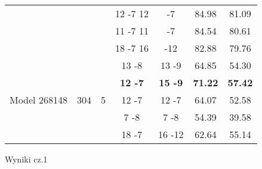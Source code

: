 \documentclass[11pt]{article}
\begin{document}
\begin{figure}
\begin{adjustwidth}{-1cm}{}
\begin{tabular}{|c|c|c|c|c|c|c|}
									  &&& 12 -7 12& -7  & 84.98 & 81.09 \\ 
									  &&& 11 -7 11& -7  & 84.54 & 80.61 \\
									  &&& 18 -7 16& -12 & 82.88 & 79.76 \\
		\hline					
		\multirow{5}{*}{Model 268148} &	
		\multirow{7}{*}{304}            &	  
		\multirow{5}{*}{5} & 13 -8 & 13 -9 & 64.85 & 54.30 \\
									  &&& \textbf{12 -7} & \textbf{15 -9} & \textbf{71.22} & \textbf{57.42} \\
									  &&& 12 -7 & 12 -7 & 64.07 & 52.58 \\
									  &&& 7 -8  & 7 -8  & 54.39 & 39.58 \\
									  &&& 18 -7 & 16 -12& 62.64 & 55.14 \\
		\hline
		
	\end{tabular}
	\caption{\label{tab:text1}Wyniki cz.1}
	\end{adjustwidth}
	\end{figure}
\end{document}

